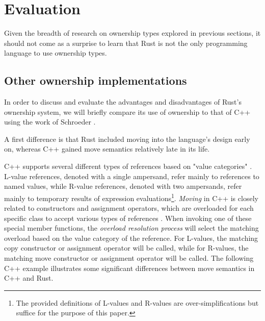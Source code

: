 \documentclass[sigplan,11pt,nonacm]{acmart}
\begin{document}



\section{Evaluation}

Given the breadth of research on ownership types explored in previous sections, it should not come as a surprise to learn that Rust is not the only programming language to use ownership types.

\subsection{Other ownership implementations}
\label{sec:other-ownership-implementations}

In order to discuss and evaluate the advantages and disadvantages of Rust's ownership system, we will briefly compare its use of ownership to that of C++ using the work of Schroeder \cite{cpp-rust-ownership}.

A first difference is that Rust included moving into the language's design early on, whereas C++ gained move semantics relatively late in its life.

C++ supports several different types of references based on "value categories" \cite{cpp-value-categories}.
L-value references, denoted with a single ampersand, refer mainly to references to named values, while R-value references, denoted with two ampersands, refer mainly to temporary results of expression evaluations\footnote{The provided definitions of L-values and R-values are over-simplifications but suffice for the purpose of this paper.}.
\emph{Moving} in C++ is closely related to constructors and assignment operators, which are overloaded for each specific class to accept various types of references \cite{cpp-rust-ownership}.
When invoking one of these special member functions, the \emph{overload resolution process} will select the matching overload based on the value category of the reference.
For L-values, the matching copy constructor or assignment operator will be called, while for R-values, the matching move constructor or assignment operator will be called.
The following C++ example illustrates some significant differences between move semantics in C++ and Rust.
\end{document}
